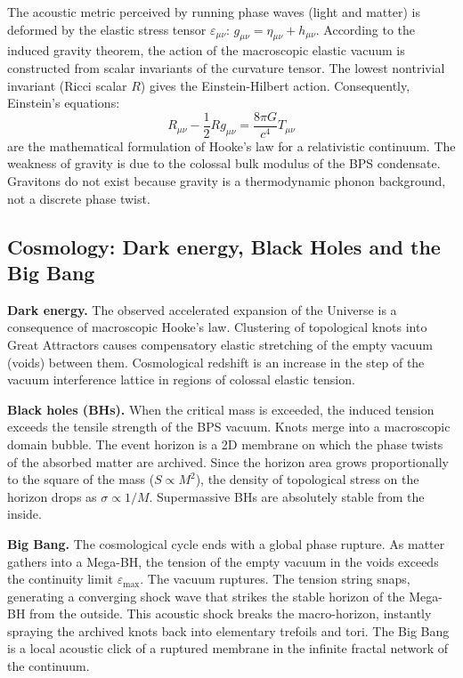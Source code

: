 \documentclass[11pt,a4paper]{article}
\begin{document}
The acoustic metric perceived by running phase waves (light and matter) is deformed by the elastic stress tensor $\varepsilon_{\mu\nu}$: $g_{\mu\nu} = \eta_{\mu\nu} + h_{\mu\nu}$. According to the induced gravity theorem, the action of the macroscopic elastic vacuum is constructed from scalar invariants of the curvature tensor. The lowest nontrivial invariant (Ricci scalar $R$) gives the Einstein-Hilbert action. Consequently, Einstein's equations:
\begin{equation}
R_{\mu\nu} - \frac{1}{2}R g_{\mu\nu} = \frac{8\pi G}{c^4} T_{\mu\nu}
\end{equation}
are the mathematical formulation of Hooke's law for a relativistic continuum. The weakness of gravity is due to the colossal bulk modulus of the BPS condensate. Gravitons do not exist because gravity is a thermodynamic phonon background, not a discrete phase twist.

\subsection{Cosmology: Dark energy, Black Holes and the Big Bang}
\textbf{Dark energy.} The observed accelerated expansion of the Universe is a consequence of macroscopic Hooke's law. Clustering of topological knots into Great Attractors causes compensatory elastic stretching of the empty vacuum (voids) between them. Cosmological redshift is an increase in the step of the vacuum interference lattice in regions of colossal elastic tension.

\textbf{Black holes (BHs).} When the critical mass is exceeded, the induced tension exceeds the tensile strength of the BPS vacuum. Knots merge into a macroscopic domain bubble. The event horizon is a 2D membrane on which the phase twists of the absorbed matter are archived. Since the horizon area grows proportionally to the square of the mass ($S \propto M^2$), the density of topological stress on the horizon drops as $\sigma \propto 1/M$. Supermassive BHs are absolutely stable from the inside.

\textbf{Big Bang.} The cosmological cycle ends with a global phase rupture. As matter gathers into a Mega-BH, the tension of the empty vacuum in the voids exceeds the continuity limit $\varepsilon_{\text{max}}$. The vacuum ruptures. The tension string snaps, generating a converging shock wave that strikes the stable horizon of the Mega-BH from the outside. This acoustic shock breaks the macro-horizon, instantly spraying the archived knots back into elementary trefoils and tori. The Big Bang is a local acoustic click of a ruptured membrane in the infinite fractal network of the continuum.
\end{document}
